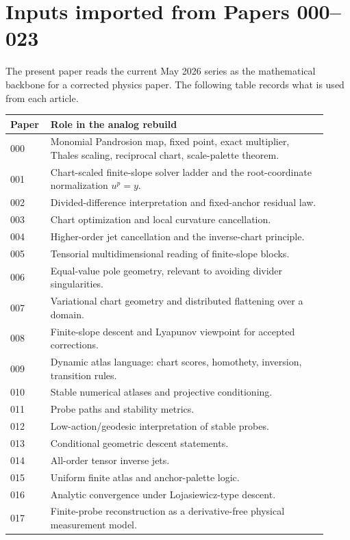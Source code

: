 \documentclass[11pt]{article}
\begin{document}
\section{Inputs imported from Papers 000--023}

The present paper reads the current May 2026 series as the mathematical
backbone for a corrected physics paper.  The following table records what is
used from each article.

\begin{center}
\small
\begin{tabular}{@{}p{0.10\linewidth}p{0.82\linewidth}@{}}
\toprule
Paper & Role in the analog rebuild\\
\midrule
000 & Monomial Pandrosion map, fixed point, exact multiplier, Thales scaling, reciprocal chart, scale-palette theorem.\\
001 & Chart-scaled finite-slope solver ladder and the root-coordinate normalization \(u^p=y\).\\
002 & Divided-difference interpretation and fixed-anchor residual law.\\
003 & Chart optimization and local curvature cancellation.\\
004 & Higher-order jet cancellation and the inverse-chart principle.\\
005 & Tensorial multidimensional reading of finite-slope blocks.\\
006 & Equal-value pole geometry, relevant to avoiding divider singularities.\\
007 & Variational chart geometry and distributed flattening over a domain.\\
008 & Finite-slope descent and Lyapunov viewpoint for accepted corrections.\\
009 & Dynamic atlas language: chart scores, homothety, inversion, transition rules.\\
010 & Stable numerical atlases and projective conditioning.\\
011 & Probe paths and stability metrics.\\
012 & Low-action/geodesic interpretation of stable probes.\\
013 & Conditional geometric descent statements.\\
014 & All-order tensor inverse jets.\\
015 & Uniform finite atlas and anchor-palette logic.\\
016 & Analytic convergence under Lojasiewicz-type descent.\\
017 & Finite-probe reconstruction as a derivative-free physical measurement model.\\

\end{tabular}
\end{center}
\end{document}
